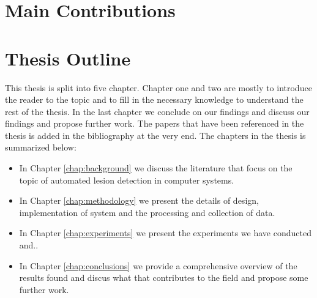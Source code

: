 \documentclass[thesis.tex]{subfiles}
\begin{document}
\section{Main Contributions} \label{sec:main_contributions}


\section{Thesis Outline} \label{sec:thesis_outline}
This thesis is split into five chapter. Chapter one and two are mostly to introduce the reader to the topic and to fill in the necessary knowledge to understand the rest of the thesis. In the last chapter we conclude on our findings and discuss our findings and propose further work. The papers that have been referenced in the thesis is added in the bibliography at the very end. The chapters in the thesis is summarized below:

\begin{itemize}
\item In Chapter \ref{chap:background} we discuss the literature that focus on the topic of automated lesion detection in computer systems.

\item In Chapter \ref{chap:methodology} we present the details of design, implementation of system and the processing and collection of data.

\item In Chapter \ref{chap:experiments} we present the experiments we have conducted and..

\item In Chapter \ref{chap:conclusions} we provide a comprehensive overview of the results found and discus what that contributes to the field and propose some further work.

\end{itemize}
\end{document}
